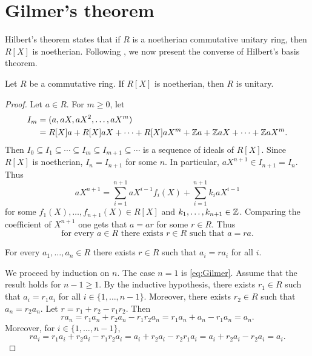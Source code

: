 \section{Gilmer's theorem}

Hilbert's theorem states that 
if $R$ is a noetherian 
commutative unitary ring, then
$R[X]$ is noetherian. Following \cite{MR212007}, 
we now present the converse of Hilbert's basis theorem. 

\begin{theorem}[Gilmer]
    Let $R$ be a commutative ring. If $R[X]$ is noetherian, 
    then $R$ is unitary. 
\end{theorem}

\begin{proof}
    Let $a\in R$. For $m\geq0$, let
    \begin{align*}
    I_m&=(a,aX,aX^2,\dots,aX^m)\\
    &=R[X]a+R[X]aX+\cdots+R[X]aX^m+\mathbb{Z} a+\mathbb{Z} aX+\cdots+\mathbb{Z} aX^m.
    \end{align*}
    Then $I_0\subseteq I_1\subseteq\cdots\subseteq I_m\subseteq I_{m+1}\subseteq\cdots$ 
    is a sequence of ideals of $R[X]$. Since $R[X]$ is noetherian,
    $I_n=I_{n+1}$ for some $n$. In particular, 
    $aX^{n+1}\in I_{n+1}=I_n$. Thus
    \[
    aX^{n+1}=\sum_{i=1}^{n+1} aX^{i-1}f_i(X)+\sum_{i=1}^{n+1} k_iaX^{i-1}
    \]
    for some $f_1(X),\dots,f_{n+1}(X)\in R[X]$ and 
    $k_1,\dots,k_{n+1}\in\mathbb{Z}$. Comparing the coefficient of $X^{n+1}$ 
    one gets that $a=ar$ for some $r\in R$. 
    Thus  
    \begin{equation}
        \label{eq:Gilmer}
        \text{for every $a\in R$ there exists $r\in R$ 
    such that $a=ra$.}
    \end{equation}
    
    \begin{claim}
        For every $a_1,\dots,a_n\in R$ there exists $r\in R$ 
        such that $a_i=ra_i$ for all $i$. 
    \end{claim}
    
    We proceed by induction on $n$. 
    The case $n=1$ is \eqref{eq:Gilmer}. Assume 
    that the result holds for $n-1\geq1$. By the inductive hypothesis, 
    there exists $r_1\in R$ such that $a_i=r_1a_i$ 
    for all $i\in\{1,\dots,n-1\}$. Moreover, 
    there exists $r_2\in R$ such that $a_n=r_2a_n$. 
    Let $r=r_1+r_2-r_1r_2$. Then
    \[
    ra_n=r_1a_n+r_2a_n-r_1r_2a_n=r_1a_n+a_n-r_1a_n=a_n.
    \]
    Moreover, for $i\in\{1,\dots,n-1\}$, 
    \[
    ra_i=r_1a_i+r_2a_i-r_1r_2a_i=a_i+r_2a_i-r_2r_1a_i=a_i+r_2a_i-r_2a_i=a_i.
    \]
    

\end{proof}
